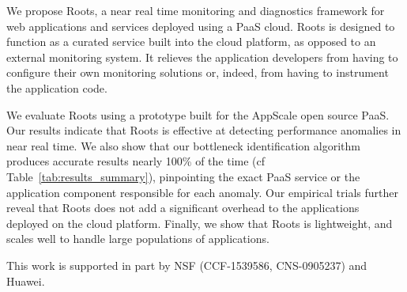 We propose Roots, a near real time monitoring and diagnostics
framework for web applications and services deployed using a PaaS cloud. 
Roots is designed to function as a curated service
built into the cloud platform, as opposed to an external monitoring system. 
It relieves the application developers from having to configure
their own monitoring solutions or, indeed,
from having to instrument the application code.


We evaluate Roots using a prototype built for the AppScale open source PaaS. 
Our results indicate that Roots is effective at detecting performance anomalies
in near real time. We also show that our bottleneck identification algorithm
produces accurate results nearly 100\% of the time (cf
Table~\ref{tab:results_summary}), pinpointing the exact PaaS
service or the application component responsible for each anomaly. Our empirical trials further 
reveal that Roots does not add a significant overhead to the applications deployed
on the cloud platform. Finally, we show that Roots is lightweight, 
and scales well to handle large populations of applications. 


\vspace{0.1in}
\noindent
This work is supported in part by NSF (CCF-1539586, CNS-0905237) and Huawei.
